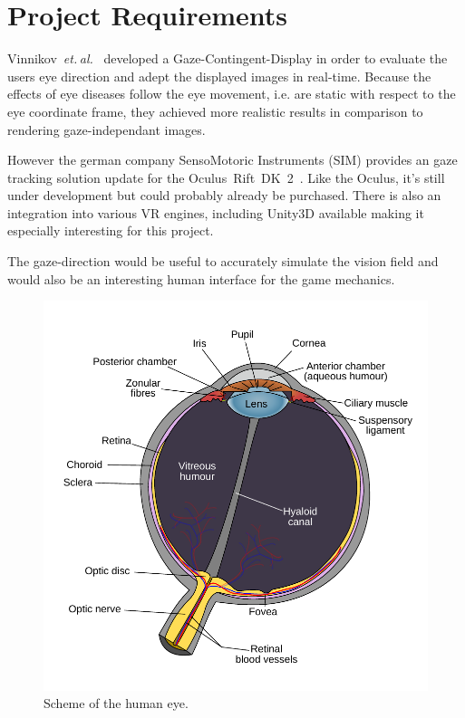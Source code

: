 \documentclass{acm_proc_article-sp}
\newcommand{\etal}{\textit{et. al.}}
\begin{document}
\section{Project Requirements}
Vinnikov \etal \cite{gazedisplays} developed a Gaze-Contingent-Display in order
to evaluate the users eye direction and adept the displayed images in real-time.
Because the effects of eye diseases follow the eye movement, i.e. are static
with respect to the eye coordinate frame, they achieved more realistic results
in comparison to rendering gaze-independant images.

However the german company SensoMotoric Instruments (SIM) provides an gaze
tracking solution update for the Oculus Rift DK 2 \cite{smi-oculus, arstechoculus}.
Like the Oculus, it's
still under development but could probably already be purchased. There is also
an integration into various VR engines, including Unity3D available making it
especially interesting for this project.

The gaze-direction would be useful to accurately simulate the vision field
and would also be an interesting human interface for the game mechanics.

\begin{figure}
    \centering
    \includegraphics[width=\columnwidth]{human_eye_scheme.pdf}
    \caption{Scheme of the human eye.}
    \label{humaneye}
\end{figure}
\end{document}
